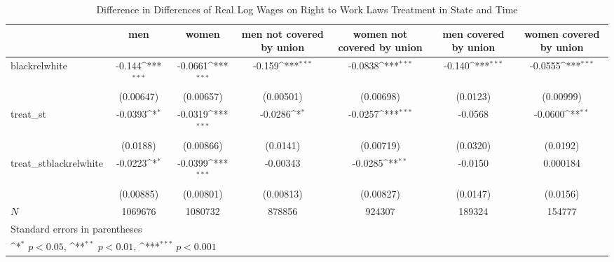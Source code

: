 \begin{table}[htbp]\centering
\def\sym#1{\ifmmode^{#1}\else\(^{#1}\)\fi}
\caption{Difference in Differences of Real Log Wages on Right to Work Laws Treatment in State and Time}
\begin{tabular}{l*{6}{c}}
\hline\hline
            &\multicolumn{1}{c}{men}&\multicolumn{1}{c}{women}&\multicolumn{1}{c}{men not covered by union}&\multicolumn{1}{c}{women not covered by union}&\multicolumn{1}{c}{men covered by union}&\multicolumn{1}{c}{women covered by union}\\
\hline
blackrelwhite&      -0.144\sym{***}&     -0.0661\sym{***}&      -0.159\sym{***}&     -0.0838\sym{***}&      -0.140\sym{***}&     -0.0555\sym{***}\\
            &   (0.00647)         &   (0.00657)         &   (0.00501)         &   (0.00698)         &    (0.0123)         &   (0.00999)         \\
[1em]
treat\_st    &     -0.0393\sym{*}  &     -0.0319\sym{***}&     -0.0286\sym{*}  &     -0.0257\sym{***}&     -0.0568         &     -0.0600\sym{**} \\
            &    (0.0188)         &   (0.00866)         &    (0.0141)         &   (0.00719)         &    (0.0320)         &    (0.0192)         \\
[1em]
treat\_stblackrelwhite&     -0.0223\sym{*}  &     -0.0399\sym{***}&    -0.00343         &     -0.0285\sym{**} &     -0.0150         &    0.000184         \\
            &   (0.00885)         &   (0.00801)         &   (0.00813)         &   (0.00827)         &    (0.0147)         &    (0.0156)         \\
\hline
\(N\)       &     1069676         &     1080732         &      878856         &      924307         &      189324         &      154777         \\
\hline\hline
\multicolumn{7}{l}{\footnotesize Standard errors in parentheses}\\
\multicolumn{7}{l}{\footnotesize \sym{*} \(p<0.05\), \sym{**} \(p<0.01\), \sym{***} \(p<0.001\)}\\
\end{tabular}
\end{table}

